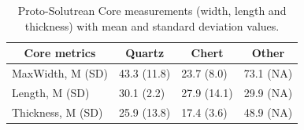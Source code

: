 \documentclass[12pt,twoside]{reedthesis}
\begin{document}
\begin{table}

\caption{\label{tab:unnamed-chunk-72}Proto-Solutrean Core measurements (width, length and thickness) with mean and standard deviation values.}
\centering
\begin{tabular}[t]{llll}
\toprule
\multicolumn{1}{c}{\textbf{Core metrics}} & \multicolumn{1}{c}{\textbf{Quartz}} & \multicolumn{1}{c}{\textbf{Chert}} & \multicolumn{1}{c}{\textbf{Other}}\\
\midrule
MaxWidth, M (SD) & 43.3 (11.8) & 23.7 (8.0) & 73.1 (NA)\\
Length, M (SD) & 30.1 (2.2) & 27.9 (14.1) & 29.9 (NA)\\
Thickness, M (SD) & 25.9 (13.8) & 17.4 (3.6) & 48.9 (NA)\\
\bottomrule
\end{tabular}
\end{table}
\end{document}
